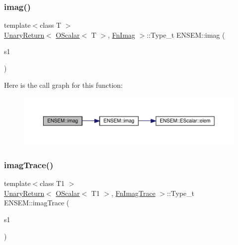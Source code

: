 \subsubsection{\texorpdfstring{imag()}{imag()}}
{\footnotesize\ttfamily template$<$class T $>$ \\
\mbox{\hyperlink{structENSEM_1_1UnaryReturn}{Unary\+Return}}$<$ \mbox{\hyperlink{classENSEM_1_1OScalar}{O\+Scalar}}$<$ T $>$, \mbox{\hyperlink{structENSEM_1_1FnImag}{Fn\+Imag}} $>$\+::Type\+\_\+t E\+N\+S\+E\+M\+::imag (\begin{DoxyParamCaption}\item[{const \mbox{\hyperlink{classENSEM_1_1OScalar}{O\+Scalar}}$<$ T $>$ \&}]{s1 }\end{DoxyParamCaption})\hspace{0.3cm}{\ttfamily [inline]}}

Here is the call graph for this function\+:\nopagebreak
\begin{figure}[H]
\begin{center}
\leavevmode
\includegraphics[width=350pt]{d1/d71/group__obsscalar_ga5c386e541e4c92b380ed34d5a27a6b13_cgraph}
\end{center}
\end{figure}
\mbox{\label{group__obsscalar_ga1dff0d4b73bbb026e6a9287ffd531523}} 
\subsubsection{\texorpdfstring{imagTrace()}{imagTrace()}}
{\footnotesize\ttfamily template$<$class T1 $>$ \\
\mbox{\hyperlink{structENSEM_1_1UnaryReturn}{Unary\+Return}}$<$ \mbox{\hyperlink{classENSEM_1_1OScalar}{O\+Scalar}}$<$ T1 $>$, \mbox{\hyperlink{structENSEM_1_1FnImagTrace}{Fn\+Imag\+Trace}} $>$\+::Type\+\_\+t E\+N\+S\+E\+M\+::imag\+Trace (\begin{DoxyParamCaption}\item[{const \mbox{\hyperlink{classENSEM_1_1OScalar}{O\+Scalar}}$<$ T1 $>$ \&}]{s1 }\end{DoxyParamCaption})\hspace{0.3cm}{\ttfamily [inline]}}

